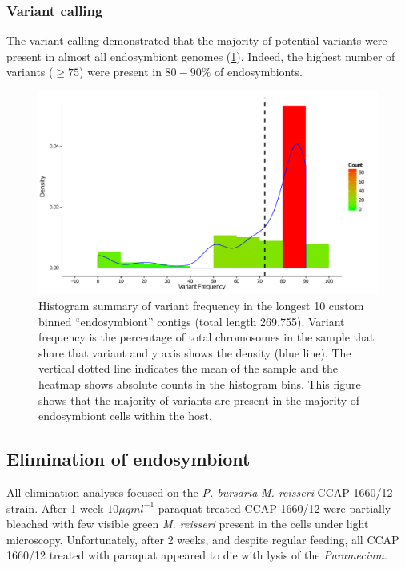 \subsubsection{Variant calling}

The variant calling demonstrated that the majority of potential
variants were present in almost all endosymbiont genomes (\cref{fig:var_contig}).
Indeed, the highest number of variants (\(\geq 75\)) were present in 
\(80-90\%\) of endosymbionts.

\begin{figure}
    \centering
    \includegraphics[width=\textwidth]{snp_variant_longest_contig.pdf}
    \caption[Endosymbiont variant count and frequency density]{
        Histogram summary of variant frequency in the longest 
        10 custom binned ``endosymbiont'' contigs (total length \SI{269,755}{\bp}).
        Variant frequency is the percentage of total chromosomes
        in the sample that share that variant and y axis shows
        the density (blue line).  The vertical dotted line indicates
        the mean of the sample and the heatmap shows absolute counts
        in the histogram bins. This figure shows that the majority
        of variants are present in the majority of endosymbiont
    cells within the host.}
    \label{fig:var_contig}
\end{figure}

\subsection{Elimination of endosymbiont}

All elimination analyses focused on the \textit{P. bursaria}-\textit{M. reisseri}
CCAP 1660/12 strain.
After 1 week \(10\mu g ml^{-1}\) paraquat treated CCAP 1660/12 were partially bleached
with few visible green \textit{M. reisseri} present in the cells under light
microscopy.
Unfortunately, after 2 weeks, and despite regular feeding, all CCAP 1660/12
treated with paraquat appeared to die with lysis of the \textit{Paramecium}.

